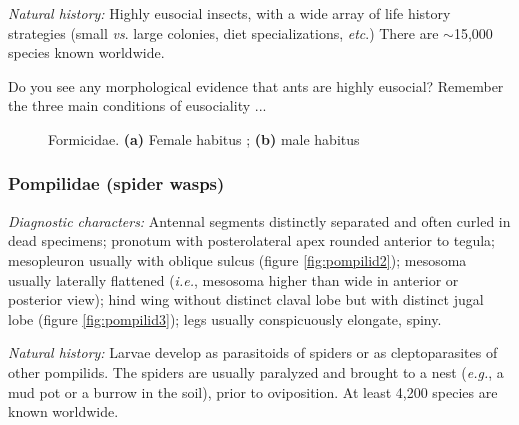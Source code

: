 \noindent{}\textit{Natural history:} Highly eusocial insects, with a wide array of life history strategies (small \textit{vs}. large colonies, diet specializations, \textit{etc}.) There are $\sim$15,000 species known worldwide.\vspace{3mm}

\begin{theo}
{}Do you see any morphological evidence that ants are highly eusocial? Remember the three main conditions of eusociality ...
\end{theo}

\begin{figure}[ht]
    \centering
    \begin{subfigure}[ht!]{0.42\textwidth}
        \caption{}
        \label{fig:formicid1}
    \end{subfigure}
    \qquad
    \begin{subfigure}[ht!]{0.3\textwidth}
        \caption{}
        \label{fig:formicid2}
    \end{subfigure}
    \caption{Formicidae. \textbf{(a)} Female habitus \citep[][Fig. 91]{goulet1993hymenoptera}; \textbf{(b)} male habitus \citep[][Fig. 92]{goulet1993hymenoptera}}\label{fig:formicids}
\end{figure}

\subsubsection{Pompilidae (spider wasps)}
\noindent{}\textit{Diagnostic characters:} Antennal segments distinctly separated and often curled in dead specimens; pronotum with posterolateral apex rounded anterior to tegula; mesopleuron usually with oblique sulcus (figure \ref{fig:pompilid2}); mesosoma usually laterally flattened (\textit{i.e.}, mesosoma higher than wide in anterior or posterior view); hind wing without distinct claval lobe but with distinct jugal lobe (figure \ref{fig:pompilid3}); legs usually conspicuously elongate, spiny.\vspace{3mm}

\noindent{}\textit{Natural history:} Larvae develop as parasitoids of spiders or as cleptoparasites of other pompilids. The spiders are usually paralyzed and brought to a nest (\textit{e.g.}, a mud pot or a burrow in the soil), prior to oviposition. At least 4,200 species are known worldwide.

